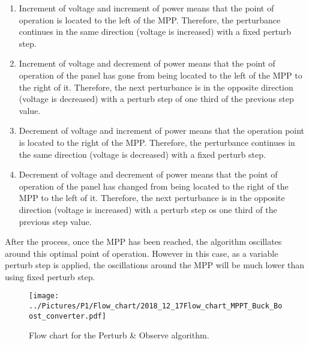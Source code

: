 \begin{enumerate}
	\item Increment of voltage and increment of power means that the point of operation is located to the left of the MPP. Therefore, the perturbance continues in the same direction (voltage is increased) with a fixed perturb step. 
	\item Increment of voltage and decrement of power means that the point of operation of the panel has gone from being located to the left of the MPP to the right of it. Therefore, the next perturbance is in the opposite direction (voltage is decreased) with a perturb step of one third of the previous step value.
	\item Decrement of voltage and increment of power means that the operation point is located to the right of the MPP. Therefore, the perturbance continues in the same direction (voltage is decreased) with a fixed perturb step. 
	\item Decrement of voltage and decrement of power means that the point of operation of the panel has changed from being located to the right of the MPP to the left of it. Therefore, the next perturbance is in the opposite direction (voltage is increased) with a perturb step os one third of the previous step value.
\end{enumerate}

After the process, once the MPP has been reached, the algorithm oscillates around this optimal point of operation. However in this case, as a variable perturb step is applied, the oscillations around the MPP will be much lower than using fixed perturb step.  




\begin{figure}[H]
	\begin{center}
		\texttt{[image: ../Pictures/P1/Flow\_chart/2018\_12\_17Flow\_chart\_MPPT\_Buck\_Boost\_converter.pdf]}
		\caption{Flow chart for the Perturb \& Observe algorithm.}
		\label{fcfinal} 
	\end{center}	
\end{figure}

\iffalse
THINGS TO CHANGE IN THE ALGORITHM (code and flow chart):
\begin{itemize}
	\item Dmin=0.05 and Dmax=0.95 not necessary as D is not duty cycle! Check everywhere to change D for control variable. 
	\item Logic for the reset of deltaD when the system detects a change in irradiance. I think we shouldn't include this condition in the flow chart we can just show the results in graphs (in the next section) and we make the flow chart easier to read and just showing the main code. 
	\item Not necessary the start counter because with the counter for the open loop calculation the MPPT is enabled after the Voc has been reached. 
\end{itemize}
\fi


